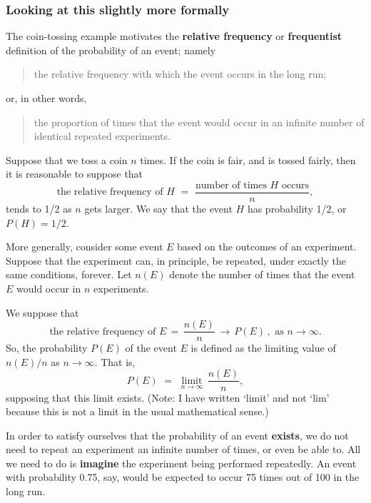 \documentclass[
  british,
  11pt,
  openany, a4paper]{book}
\begin{document}
\subsubsection*{Looking at this slightly more formally}\label{looking-at-this-slightly-more-formally}

The coin-tossing example motivates the \textbf{relative frequency} or \textbf{frequentist} definition of the probability of an event; namely

\begin{quote}
the relative frequency with which the event occurs in the long run;
\end{quote}

or, in other words,

\begin{quote}
the proportion of times that the event would occur in an infinite number of identical repeated experiments.
\end{quote}

Suppose that we toss a coin \(n\) times. If the coin is fair, and is tossed fairly, then it is reasonable to suppose that
\[\text{the relative frequency of } H \,\,=\,\, 
\frac{\text{number of times } H \text{ occurs}}{n},\]
tends to 1/2 as \(n\) gets larger. We say that the event \(H\) has probability 1/2, or \(P(H)=1/2\).

More generally, consider some event \(E\) based on the outcomes of an experiment. Suppose that the experiment can, in principle, be repeated, under exactly the same conditions, forever. Let \(n(E)\) denote the number of times that the event \(E\) would occur in \(n\) experiments.

We suppose that
\[\text{the relative frequency of $E$} \,=\,
\frac{n(E)}{n} \,\longrightarrow\, P(E)\,, \,\, \text{as }n \longrightarrow \infty.\]
So, the probability \(P(E)\) of the event \(E\) is defined as the limiting value of \(n(E)/n\) as \(n \rightarrow \infty\). That is,
\begin{equation}
P(E) \,\,=\,\, \mathop {\mathrm{limit}}\limits_{n \rightarrow \infty}\,\frac{n(E)}{n},
\label{eq:limit}
\end{equation}
supposing that this limit exists. (Note: I have written `limit' and not `lim' because this is not a limit in the usual mathematical sense.)

In order to satisfy ourselves that the probability of an event \textbf{exists}, we do not need to repeat an experiment an infinite number of times, or even be able to. All we need to do is \textbf{imagine} the experiment being performed repeatedly. An event with probability 0.75, say, would be expected to occur 75 times out of 100 in the long run.
\end{document}
